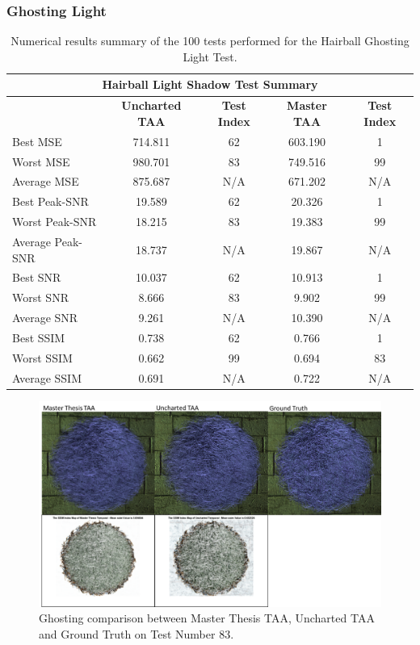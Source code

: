 \documentclass{cslthse-msc}
\begin{document}
\subsubsection{Ghosting Light}
\begin{table}[H]
	\small
	\centering
	\caption{Numerical results summary of the 100 tests performed for the Hairball Ghosting Light Test.}
	\begin{tabular}{|l|c|c|c|c|}
		\hline
		\multicolumn{5}{|c|}{\textbf{Hairball Light Shadow Test Summary}} \\
		\hline
		\multicolumn{1}{|c|}{\textbf{\diagbox{Tests}{AA}}} & \textbf{Uncharted TAA} & \textbf{Test Index} & \textbf{Master TAA} & \textbf{Test Index} \\
		\hline
		Best MSE & 714.811 & 62    & 603.190 & 1 \\
		\hline
		Worst MSE & 980.701 & 83    & 749.516 & 99 \\
		\hline
		Average MSE & 875.687 & N/A   & 671.202 & N/A \\
		\hline
		Best Peak-SNR & 19.589 & 62    & 20.326 & 1 \\
		\hline
		Worst Peak-SNR & 18.215 & 83    & 19.383 & 99 \\
		\hline
		Average Peak-SNR  & 18.737 & N/A   & 19.867 & N/A \\
		\hline
		Best SNR & 10.037 & 62    & 10.913 & 1 \\
		\hline
		Worst SNR & 8.666 & 83    & 9.902 & 99 \\
		\hline
		Average SNR  & 9.261 & N/A   & 10.390 & N/A \\
		\hline
		Best SSIM & 0.738 & 62    & 0.766 & 1 \\
		\hline
		Worst SSIM & 0.662 & 99    & 0.694 & 83 \\
		\hline
		Average SSIM & 0.691 & N/A   & 0.722 & N/A \\
		\hline
	\end{tabular}%
	\label{tab:hairball_ghosting_lighted}%
\end{table}%

\begin{figure}[H]
	\centering
	\includegraphics[scale=0.8]{images/results/hairball_ghosting_lighted.png}
	\caption{Ghosting comparison between Master Thesis TAA, Uncharted TAA and Ground Truth on Test Number 83.}\label{fig:hairball_ghosting_lighted}
\end{figure}
\end{document}
